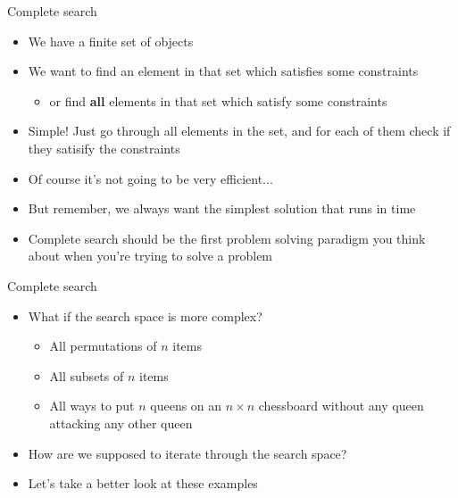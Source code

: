\documentclass[12pt,t]{beamer}
\newcommand{\bi}{\begin{itemize}}
\newcommand{\ei}{\end{itemize}}
\begin{document}
\begin{frame}{Complete search}
    \vspace{5pt}
    \bi
        \item We have a finite set of objects
        \item We want to find an element in that set which satisfies some constraints
            \bi
                \item or find \textbf{all} elements in that set which satisfy some constraints
            \ei

        \vspace{5pt}
        \item Simple! Just go through all elements in the set, and for each of them check if they satisify the constraints
        \item Of course it's not going to be very efficient...
        \item But remember, we always want the simplest solution that runs in time
        \item Complete search should be the first problem solving paradigm you think about when you're trying to solve a problem
    \ei
\end{frame}


\begin{frame}{Complete search}
    \vspace{20pt}
    \bi
        \item What if the search space is more complex?
            \bi
                \item All permutations of $n$ items
                \item All subsets of $n$ items
                \item All ways to put $n$ queens on an $n\times n$ chessboard without any queen attacking any other queen
            \ei
        \item How are we supposed to iterate through the search space?
        \item Let's take a better look at these examples
    \ei
\end{frame}
\end{document}
